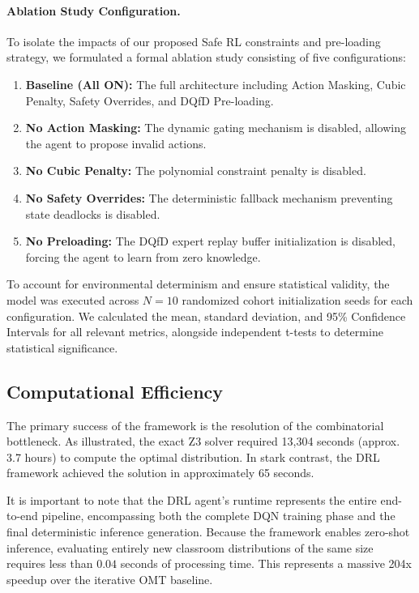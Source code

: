 \documentclass{icai2026} %
\begin{document}
\paragraph{Ablation Study Configuration.}
To isolate the impacts of our proposed Safe RL constraints and pre-loading strategy, we formulated a formal ablation study consisting of five configurations:
\begin{enumerate}
    \item \textbf{Baseline (All ON):} The full architecture including Action Masking, Cubic Penalty, Safety Overrides, and DQfD Pre-loading.
    \item \textbf{No Action Masking:} The dynamic gating mechanism is disabled, allowing the agent to propose invalid actions.
    \item \textbf{No Cubic Penalty:} The polynomial constraint penalty is disabled.
    \item \textbf{No Safety Overrides:} The deterministic fallback mechanism preventing state deadlocks is disabled.
    \item \textbf{No Preloading:} The DQfD expert replay buffer initialization is disabled, forcing the agent to learn from zero knowledge.
\end{enumerate}
To account for environmental determinism and ensure statistical validity, the model was executed across $N=10$ randomized cohort initialization seeds for each configuration. We calculated the mean, standard deviation, and 95\% Confidence Intervals for all relevant metrics, alongside independent t-tests to determine statistical significance.

\subsection{Computational Efficiency}
The primary success of the framework is the resolution of the combinatorial bottleneck. 
As illustrated, the exact Z3 solver required 13,304 seconds (approx. 3.7 hours) to compute the optimal distribution. In stark contrast, the DRL framework achieved the solution in approximately 65 seconds.

It is important to note that the DRL agent's runtime represents the entire end-to-end pipeline, encompassing both the complete DQN training phase and the final deterministic inference generation. Because the framework enables zero-shot inference, evaluating entirely new classroom distributions of the same size requires less than $0.04$ seconds of processing time. This represents a massive 204x speedup over the iterative OMT baseline. 
\end{document}
